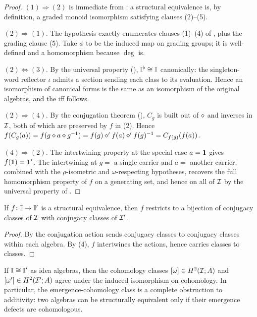 \begin{proof}
$(1)\Rightarrow(2)$ is immediate from : a
structural equivalence is, by definition, a graded monoid isomorphism
satisfying clauses (2)--(5).

$(2)\Rightarrow(1)$. The hypothesis exactly enumerates clauses (1)--(4)
of , plus the grading clause (5). Take $\phi$ to
be the induced map on grading groups; it is well-defined and a
homomorphism because $\deg$ is.

$(2)\Leftrightarrow(3)$. By the universal property
(), $\mathbb{I}^{\flat}\cong\mathbb{I}$ canonically:
the singleton-word reflector $\iota$ admits a section sending each
class to its evaluation. Hence an isomorphism of canonical forms is
the same as an isomorphism of the original algebras, and the iff
follows.

$(2)\Rightarrow(4)$. By the conjugation theorem
(), $C_g$ is built out of $\mathbin{\diamond}$ and inverses
in $\mathcal{I}$, both of which are preserved by $f$ in (2). Hence
$f(C_g(a)) = f(g\mathbin{\diamond} a\mathbin{\diamond} g^{-1}) = f(g)\mathbin{\diamond}'
f(a)\mathbin{\diamond}' f(g)^{-1} = C_{f(g)}(f(a))$.

$(4)\Rightarrow(2)$. The intertwining property at the special case
$a=\mathbf{1}$ gives $f(\mathbf{1}) = \mathbf{1}'$. The intertwining at $g=$ a
single carrier and $a=$ another carrier, combined with the
$\rho$-isometric and $\omega$-respecting hypotheses, recovers the full
homomorphism property of $f$ on a generating set, and hence on all of
$\mathcal{I}$ by the universal property of .
\end{proof}

\begin{corollary}
\label{cor:orbit-inv}
If $f\colon\mathbb{I}\to\mathbb{I}'$ is a structural equivalence, then $f$
restricts to a bijection of conjugacy classes of $\mathcal{I}$ with
conjugacy classes of $\mathcal{I}'$.
\end{corollary}

\begin{proof}
By  the conjugation action sends conjugacy classes
to conjugacy classes within each algebra. By
(4), $f$ intertwines the actions, hence carries
classes to classes.
\end{proof}

\begin{corollary}
\label{cor:omega-cohomology}
If $\mathbb{I}\cong\mathbb{I}'$ as idea algebras, then the cohomology
classes $[\omega]\in H^2(\mathcal{I};A)$ and $[\omega']\in H^2(\mathcal{I}';A)$
agree under the induced isomorphism on cohomology. In particular, the
emergence-cohomology class is a complete obstruction to additivity:
two algebras can be structurally equivalent only if their emergence
defects are cohomologous.
\end{corollary}

